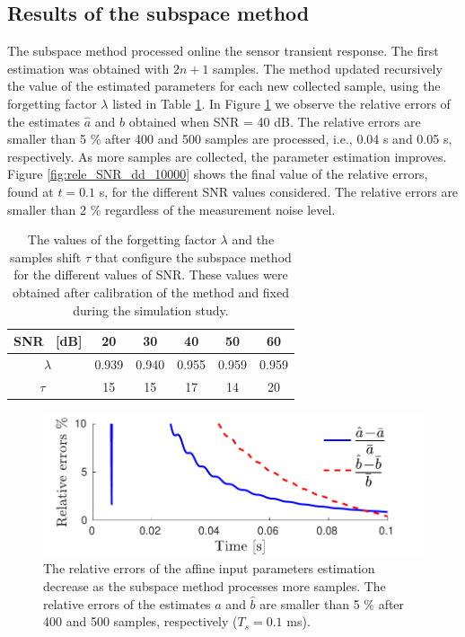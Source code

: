 \subsection{Results of the subspace method}


The subspace method processed online the sensor transient response.
The first estimation was obtained with $2n+1$ samples.
The method updated recursively the value of the estimated parameters for each new collected sample, using the forgetting factor $\lambda$ listed in Table \ref{table:lambdas}.
In Figure \ref{fig:rele_dd_40dB_s1} we observe the relative errors of the estimates $\widehat{a}$ and $\widehat{b}$ obtained when SNR = 40 dB. 
The relative errors are smaller than 5 \% after 400 and 500 samples are processed, i.e., 0.04 s and 0.05 s, respectively.
As more samples are collected, the parameter estimation improves.
Figure \ref{fig:rele_SNR_dd_10000} shows the final value of the relative errors, found at $t=0.1$ s, for the different SNR values considered.
The relative errors are smaller than 2 \% regardless of the measurement noise level.

\begin{table}[h!]
\centering
\caption{The values of the forgetting factor $\lambda$ and the samples shift $\tau$ that configure the subspace method for the different values of SNR. These values were obtained after calibration of the method and fixed during the simulation study.}
\begin{tabular}{|c c c c c c|} 
 \hline
 SNR \ [dB] & 20 & 30 & 40 & 50 & 60 \\ [0.5ex] 
 \hline
 $\lambda$ & 0.939 & 0.940 & 0.955 & 0.959 & 0.959 \\ %
 $\tau$ \  & 15 & 15 & 17 & 14 & 20 \\ [0.5ex] %
 \hline
\end{tabular}
\label{table:lambdas}
\end{table}


\begin{figure}[!htbp]
\centering
\includegraphics[width=\columnwidth]{./ChapterRampInput/fig/Fig_3.pdf} 
\caption{ \label{fig:rele_dd_40dB_s1} The relative errors of the affine input parameters estimation decrease as the subspace method processes more samples. The relative errors of the estimates $\widehat{a}$ and $\widehat{b}$ are smaller than 5 \% after 400 and 500 samples, respectively ($T_s = 0.1$ ms). }
\end{figure}


